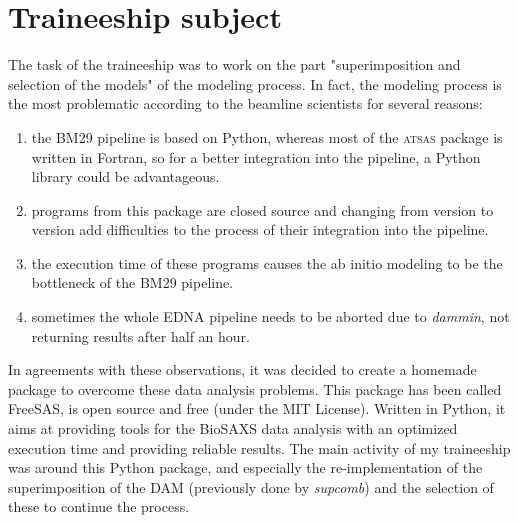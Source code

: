 \documentclass[a4paper, 11pt]{report}
\begin{document}
\section{Traineeship subject}

The task of the traineeship was to work on the part "superimposition 
and selection of the models" of the modeling process. 
In fact, the modeling process is the most problematic according to 
the beamline scientists for several reasons:
\begin{enumerate}
\item the BM29 pipeline is based on Python, whereas most
of the \textsc{atsas} package is written in Fortran, so for a better 
integration into the pipeline, a Python library could be advantageous. 
\item programs from this package are closed source and 
changing from version to version add difficulties to the process of 
their integration into the pipeline. 
\item the execution time of these programs causes the ab initio 
modeling to be the bottleneck of the BM29 pipeline. 
\item sometimes the whole EDNA pipeline needs to be aborted 
due to \textit{dammin}, not returning results after half an hour.
\end{enumerate}

In agreements with these observations, it was decided to create a 
homemade package to overcome these data analysis problems. 
This package has been called FreeSAS, is open source and free (under 
the MIT License). 
Written in Python, it aims at providing tools for the BioSAXS data 
analysis with an optimized execution time and providing reliable 
results. 
The main activity of my traineeship was around this Python package, 
and especially the re-implementation of the superimposition of the DAM 
(previously done by \textit{supcomb}) and the selection of these to 
continue the process.
\end{document}
